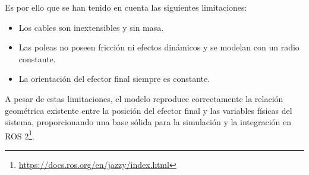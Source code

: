 \vspace{0.25cm}

Es por ello que se han tenido en cuenta las siguientes limitaciones:

\begin{itemize}
\item Los cables son inextensibles y sin masa.
\item Las poleas no poseen fricción ni efectos dinámicos y se modelan con un radio constante.
\item La orientación del efector final siempre es constante.
\end{itemize}

A pesar de estas limitaciones, el modelo reproduce correctamente la relación geométrica existente entre la posición del efector final y las variables físicas del sistema, proporcionando una base sólida para la simulación y la integración en ROS 2\footnote{\url{https://docs.ros.org/en/jazzy/index.html}}.
